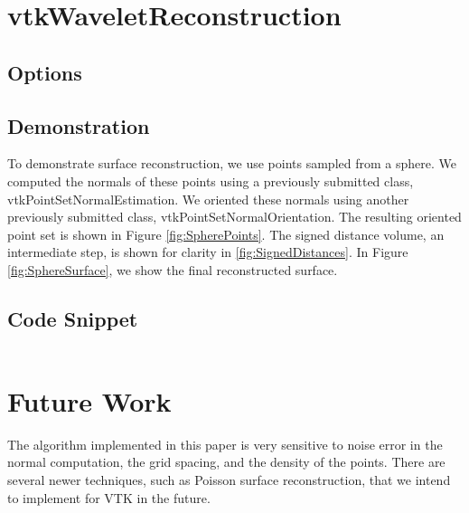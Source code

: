 \documentclass{InsightArticle}
\begin{document}
\section{vtkWaveletReconstruction}

\subsection{Options}



\subsection{Demonstration}
To demonstrate surface reconstruction, we use points sampled from a sphere. We computed the normals of these points using a previously submitted class, vtkPointSetNormalEstimation. We oriented these normals using another previously submitted class, vtkPointSetNormalOrientation. The resulting oriented point set is shown in Figure \ref{fig:SpherePoints}. The signed distance volume, an intermediate step, is shown for clarity in \ref{fig:SignedDistances}. In Figure \ref{fig:SphereSurface}, we show the final reconstructed surface.
% 

\subsection{Code Snippet}
\begin{verbatim}

\end{verbatim}

\section{Future Work}
The algorithm implemented in this paper is very sensitive to noise error in the normal computation, the grid spacing, and the density of the points. There are several newer techniques, such as Poisson surface reconstruction, that we intend to implement for VTK in the future.
\end{document}
